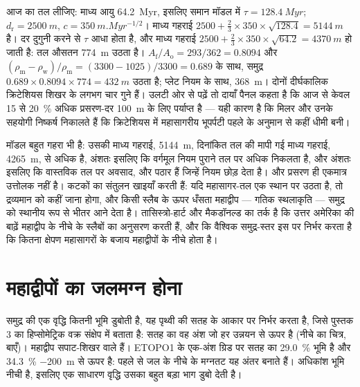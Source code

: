 \begin{example}[दुगुनी तेज़ी]\label{ex:b2:phanerozoic-earth:doubling}
आज का तल लीजिए: माध्य आयु \qty{64.2}{Myr}, इसलिए समान मॉडल में $\tau = \qty{128.4}{Myr}$;
$d_{\text{r}} = \qty{2500}{m}$, $c = \qty{350}{m.Myr^{-1/2}}$। माध्य गहराई $2500 + \tfrac23
\times 350 \times \sqrt{128.4} = \qty{5144}{m}$ है। दर दुगुनी करने से $\tau$ आधा होता है, और माध्य
गहराई $2500 + \tfrac23 \times 350 \times \sqrt{64.2} = \qty{4370}{m}$ हो जाती है: तल औसतन
\qty{774}{m} उठता है। $A_{\text{f}}/A_{\text{o}} = 293/362 = 0.8094$ और
$(\rho_{\text{m}} - \rho_{\text{w}})/\rho_{\text{m}} = (3300 - 1025)/3300 = 0.689$ के साथ, समुद्र
$0.689 \times 0.8094 \times 774 = \qty{432}{m}$ उठता है; प्लेट नियम के साथ, \qty{368}{m}। दोनों
दीर्घकालिक क्रिटेशियस शिखर के लगभग चार गुने हैं। उलटी ओर से पढ़ें तो दायाँ पैनल कहता है कि
आज से केवल 15 से \qty{20}{\percent} अधिक प्रसरण-दर \qty{100}{m} के लिए पर्याप्त है --- यही
कारण है कि मिलर और उनके सहयोगी निष्कर्ष निकालते हैं कि क्रिटेशियस में महासागरीय भूपर्पटी पहले के अनुमान से
कहीं धीमी बनी।
\end{example}

मॉडल बहुत गहरा भी है: उसकी माध्य गहराई, \qty{5144}{m}, दिनांकित तल की मापी गई माध्य गहराई,
\qty{4265}{m}, से अधिक है, अंशतः इसलिए कि वर्गमूल नियम पुराने तल पर अधिक निकलता है, और
अंशतः इसलिए कि वास्तविक तल पर अवसाद,  और पठार हैं जिन्हें नियम छोड़ देता है। और प्रसरण ही
एकमात्र उत्तोलक नहीं है। कटकों का संतुलन खाइयाँ करती हैं: यदि महासागर-तल एक स्थान पर उठता है, तो द्रव्यमान को
कहीं जाना होगा, और किसी स्लैब के ऊपर धँसता महाद्वीप --- गतिक स्थलाकृति --- समुद्र को
स्थानीय रूप से भीतर आने देता है। तासिस्त्रो-हार्ट और मैकडॉनल्ड का तर्क है कि उत्तर अमेरिका की बाढ़ें
महाद्वीप के नीचे के स्लैबों का अनुसरण करती हैं, और कि वैश्विक समुद्र-स्तर इस पर निर्भर करता है कि कितना क्षेपण
महासागरों के बजाय महाद्वीपों के नीचे होता है।

\section{महाद्वीपों का जलमग्न होना}\label{sec:b2:phanerozoic-earth:flooding}

समुद्र की एक वृद्धि कितनी भूमि डुबोती है, यह पृथ्वी की सतह के आकार पर निर्भर करता है, जिसे
पुस्तक 3 का हिप्सोमेट्रिक वक्र संक्षेप में बताता है: सतह का वह अंश जो
हर उन्नयन से ऊपर है (नीचे का चित्र, बाएँ)। महाद्वीप सपाट-शिखर वाले हैं। ETOPO1 के
एक-अंश ग्रिड पर सतह का \qty{29.0}{\percent} भूमि है और \qty{34.3}{\percent}
\qty{-200}{m} से ऊपर है: पहले से जल के नीचे के मग्नतट यह अंतर बनाते हैं। अधिकांश भूमि नीची है, इसलिए एक
साधारण वृद्धि उसका बहुत बड़ा भाग डुबो देती है।

